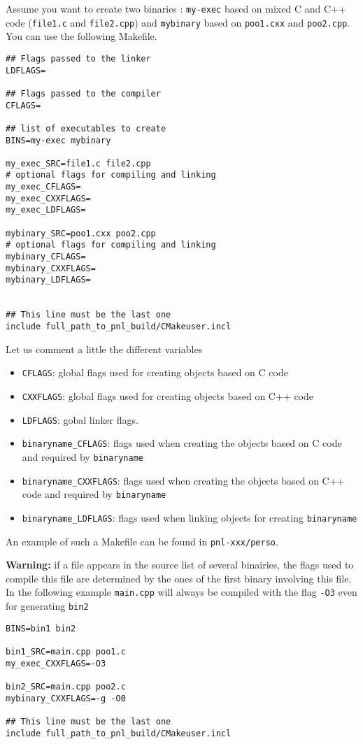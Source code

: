 \documentclass[a4paper,11pt,twoside]{article}
\begin{document}
Assume you want to create two binaries : \verb+my-exec+ based on mixed C and C++
code (\verb+file1.c+ and \verb+file2.cpp+) and \verb+mybinary+ based on
\verb+poo1.cxx+ and \verb+poo2.cpp+. You can use the following Makefile.
\begin{verbatim}
## Flags passed to the linker
LDFLAGS=

## Flags passed to the compiler
CFLAGS=

## list of executables to create
BINS=my-exec mybinary

my_exec_SRC=file1.c file2.cpp
# optional flags for compiling and linking
my_exec_CFLAGS=
my_exec_CXXFLAGS=
my_exec_LDFLAGS=

mybinary_SRC=poo1.cxx poo2.cpp
# optional flags for compiling and linking
mybinary_CFLAGS=
mybinary_CXXFLAGS=
mybinary_LDFLAGS=


## This line must be the last one
include full_path_to_pnl_build/CMakeuser.incl
\end{verbatim}
Let us comment a little the different variables
\begin{itemize}
  \item \verb+CFLAGS+: global flags used for creating objects based on C code
  \item \verb+CXXFLAGS+: global flags used for creating objects based on C++ code
  \item \verb+LDFLAGS+: gobal linker flags.
  \item \verb+binaryname_CFLAGS+: flags used when creating the objects based on
    C code and required by \verb+binaryname+
  \item \verb+binaryname_CXXFLAGS+: flags used when creating the objects based on
    C++ code and required by \verb+binaryname+
  \item \verb+binaryname_LDFLAGS+: flags used when linking objects for creating
    \verb+binaryname+
\end{itemize}
An example of such a Makefile can be found in \verb+pnl-xxx/perso+.

\textbf{Warning:} if a file appears in the source list of several binairies, the
flags used to compile this file are determined by the ones of the first binary
involving this file. In the following example \verb+main.cpp+ will always be compiled
with the flag \verb+-O3+ even for generating \verb+bin2+
\begin{verbatim}
BINS=bin1 bin2

bin1_SRC=main.cpp poo1.c
my_exec_CXXFLAGS=-O3

bin2_SRC=main.cpp poo2.c
mybinary_CXXFLAGS=-g -O0

## This line must be the last one
include full_path_to_pnl_build/CMakeuser.incl
\end{verbatim}
\end{document}
